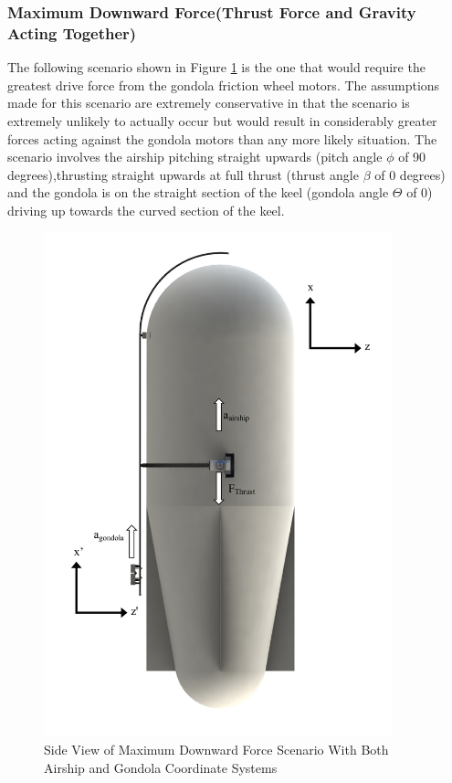 \documentclass[../main.tex]{subfiles}
\begin{document}
\subsubsection*{Maximum Downward Force(Thrust Force and Gravity Acting Together)}
The following scenario shown in Figure \ref{fig:scenario1} is the one that would require the greatest drive force from the gondola friction wheel motors. The assumptions made for this scenario are extremely conservative in that the scenario is extremely unlikely to actually occur but would result in considerably greater forces acting against the gondola motors than any more likely situation. The scenario involves the airship pitching straight upwards (pitch angle $\phi$ of 90 degrees),thrusting straight upwards at full thrust (thrust angle $\beta$ of 0 degrees) and the gondola is on the straight section of the keel (gondola angle $\Theta$ of 0) driving up towards the curved section of the keel.
\begin{figure}[H]
	\centering
	\includegraphics[width=0.9\textwidth]{img/analysis/scenario1.pdf}
	\caption{Side View of Maximum Downward Force Scenario With Both Airship and Gondola Coordinate Systems}
	\label{fig:scenario1}
\end{figure}
\end{document}
